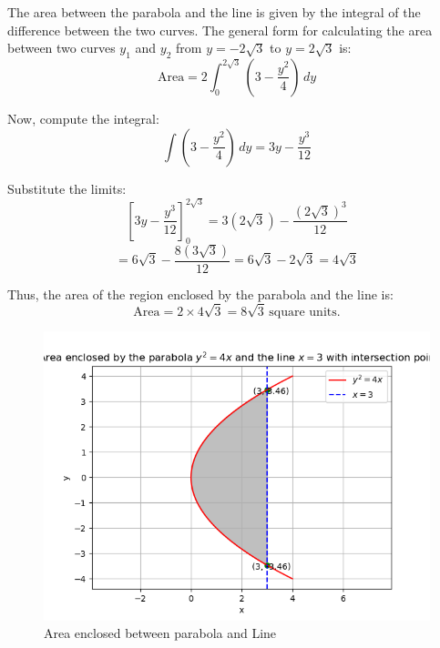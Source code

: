 \documentclass[journal]{IEEEtran}
\begin{document}
The area between the parabola and the line is given by the integral of the difference between the two curves. The general form for calculating the area between two curves $y_1$ and $y_2$ from $y = -2\sqrt{3}$ to $y = 2\sqrt{3}$ is:
\begin{equation}
\text{Area} = 2 \int_{0}^{2\sqrt{3}} \left( 3 - \frac{y^2}{4} \right) \, dy
\end{equation}

Now, compute the integral:
\begin{equation}
\int \left( 3 - \frac{y^2}{4} \right) \, dy = 3y - \frac{y^3}{12}
\end{equation}

Substitute the limits:
\begin{equation}
\left[ 3y - \frac{y^3}{12} \right]_{0}^{2\sqrt{3}} = 3(2\sqrt{3}) - \frac{(2\sqrt{3})^3}{12}
\end{equation}
\begin{equation}
= 6\sqrt{3} - \frac{8(3\sqrt{3})}{12} = 6\sqrt{3} - 2\sqrt{3} = 4\sqrt{3}
\end{equation}

Thus, the area of the region enclosed by the parabola and the line is:
\begin{equation}
\text{Area} = 2 \times 4\sqrt{3} = 8\sqrt{3} \, \text{square units}.
\end{equation}
\begin{figure}[h!]
	\centering
	\includegraphics[width=0.5\linewidth]{figs/Figure_1.png}
	\caption{Area enclosed between parabola and Line}
	\label{stemplot}
\end{figure}	
\end{document}
